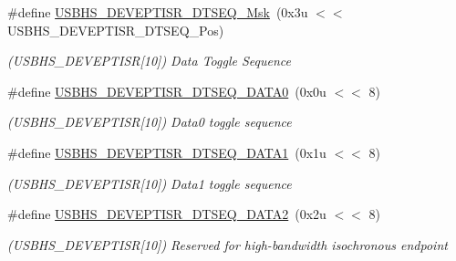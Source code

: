 \begin{DoxyCompactItemize}
\item 
\mbox{\label{group__SAME70__USBHS_gab87a693003d1be232a36df45a45d35fa}} 
\#define \mbox{\hyperlink{group__SAME70__USBHS_gab87a693003d1be232a36df45a45d35fa}{U\+S\+B\+H\+S\+\_\+\+D\+E\+V\+E\+P\+T\+I\+S\+R\+\_\+\+D\+T\+S\+E\+Q\+\_\+\+Msk}}~(0x3u $<$$<$ U\+S\+B\+H\+S\+\_\+\+D\+E\+V\+E\+P\+T\+I\+S\+R\+\_\+\+D\+T\+S\+E\+Q\+\_\+\+Pos)
\begin{DoxyCompactList}\small\item\em (U\+S\+B\+H\+S\+\_\+\+D\+E\+V\+E\+P\+T\+I\+SR\mbox{[}10\mbox{]}) Data Toggle Sequence \end{DoxyCompactList}\item 
\mbox{\label{group__SAME70__USBHS_ga686110b80786155ed941911f7bf7bac0}} 
\#define \mbox{\hyperlink{group__SAME70__USBHS_ga686110b80786155ed941911f7bf7bac0}{U\+S\+B\+H\+S\+\_\+\+D\+E\+V\+E\+P\+T\+I\+S\+R\+\_\+\+D\+T\+S\+E\+Q\+\_\+\+D\+A\+T\+A0}}~(0x0u $<$$<$ 8)
\begin{DoxyCompactList}\small\item\em (U\+S\+B\+H\+S\+\_\+\+D\+E\+V\+E\+P\+T\+I\+SR\mbox{[}10\mbox{]}) Data0 toggle sequence \end{DoxyCompactList}\item 
\mbox{\label{group__SAME70__USBHS_ga80408964fc89b049ba2ba0d502597d9d}} 
\#define \mbox{\hyperlink{group__SAME70__USBHS_ga80408964fc89b049ba2ba0d502597d9d}{U\+S\+B\+H\+S\+\_\+\+D\+E\+V\+E\+P\+T\+I\+S\+R\+\_\+\+D\+T\+S\+E\+Q\+\_\+\+D\+A\+T\+A1}}~(0x1u $<$$<$ 8)
\begin{DoxyCompactList}\small\item\em (U\+S\+B\+H\+S\+\_\+\+D\+E\+V\+E\+P\+T\+I\+SR\mbox{[}10\mbox{]}) Data1 toggle sequence \end{DoxyCompactList}\item 
\mbox{\label{group__SAME70__USBHS_gad21f23dbbe4b746cb9b0bbf10ee091f0}} 
\#define \mbox{\hyperlink{group__SAME70__USBHS_gad21f23dbbe4b746cb9b0bbf10ee091f0}{U\+S\+B\+H\+S\+\_\+\+D\+E\+V\+E\+P\+T\+I\+S\+R\+\_\+\+D\+T\+S\+E\+Q\+\_\+\+D\+A\+T\+A2}}~(0x2u $<$$<$ 8)
\begin{DoxyCompactList}\small\item\em (U\+S\+B\+H\+S\+\_\+\+D\+E\+V\+E\+P\+T\+I\+SR\mbox{[}10\mbox{]}) Reserved for high-\/bandwidth isochronous endpoint \end{DoxyCompactList}\item 

\end{DoxyCompactItemize}
